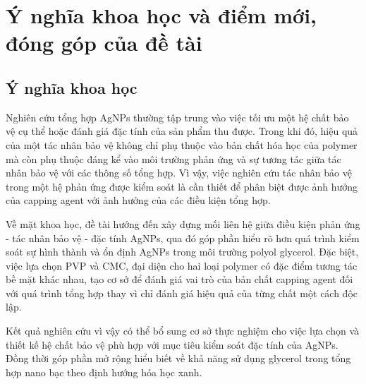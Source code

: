 \section{Ý nghĩa khoa học và điểm mới, đóng góp của đề tài}
\subsection{Ý nghĩa khoa học}
Nghiên cứu tổng hợp AgNPs thường tập trung vào việc tối ưu một hệ chất bảo vệ cụ thể hoặc đánh giá đặc tính của sản phẩm thu được.
Trong khi đó, hiệu quả của một tác nhân bảo vệ không chỉ phụ thuộc vào bản chất hóa học của polymer mà còn phụ thuộc đáng kể vào môi trường phản ứng và sự tương tác giữa tác nhân bảo vệ với các thông số tổng hợp.
Vì vậy, việc nghiên cứu tác nhân bảo vệ trong một hệ phản ứng được kiểm soát là cần thiết để phân biệt được ảnh hưởng của capping agent với ảnh hưởng của các điều kiện tổng hợp.
\par
Về mặt khoa học, đề tài hướng đến xây dựng mối liên hệ giữa điều kiện phản ứng - tác nhân bảo vệ - đặc tính AgNPs, qua đó góp phần hiểu rõ hơn quá trình kiểm soát sự hình thành và ổn định AgNPs trong môi trường polyol glycerol.
Đặc biệt, việc lựa chọn PVP và CMC, đại diện cho hai loại polymer có đặc điểm tương tác bề mặt khác nhau, tạo cơ sở để đánh giá vai trò của bản chất capping agent đối với quá trình tổng hợp thay vì chỉ đánh giá hiệu quả của từng chất một cách độc lập.
\par
Kết quả nghiên cứu vì vậy có thể bổ sung cơ sở thực nghiệm cho việc lựa chọn và thiết kế hệ chất bảo vệ phù hợp với mục tiêu kiểm soát đặc tính của AgNPs. 
Đồng thời góp phần mở rộng hiểu biết về khả năng sử dụng glycerol trong tổng hợp nano bạc theo định hướng hóa học xanh.

